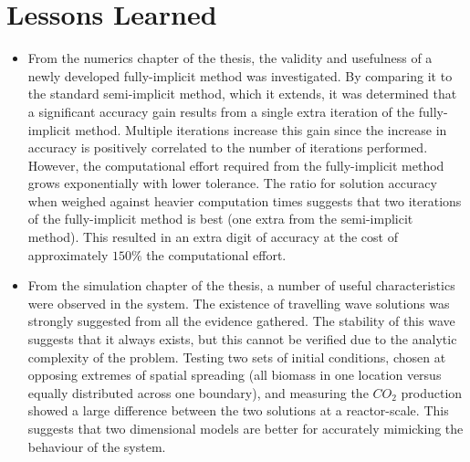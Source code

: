 \section{Lessons Learned}

\begin{itemize}
  \item From the numerics chapter of the thesis, the validity and usefulness of a newly developed fully-implicit method was investigated.
    By comparing it to the standard semi-implicit method, which it extends, it was determined that a significant accuracy gain results from a single extra iteration of the fully-implicit method.
    Multiple iterations increase this gain since the increase in accuracy is positively correlated to the number of iterations performed.
    However, the computational effort required from the fully-implicit method grows exponentially with lower tolerance.
    The ratio for solution accuracy when weighed against heavier computation times suggests that two iterations of the fully-implicit method is best (one extra from the semi-implicit method).
    This resulted in an extra digit of accuracy at the cost of approximately $150\%$ the computational effort.
  \item From the simulation chapter of the thesis, a number of useful characteristics were observed in the system.
    The existence of travelling wave solutions was strongly suggested from all the evidence gathered.
    The stability of this wave suggests that it always exists, but this cannot be verified due to the analytic complexity of the problem.
    Testing two sets of initial conditions, chosen at opposing extremes of spatial spreading (all biomass in one location versus equally distributed across one boundary), and measuring the $CO_2$ production showed a large difference between the two solutions at a reactor-scale.
    This suggests that two dimensional models are better for accurately mimicking the behaviour of the system.
\end{itemize}

